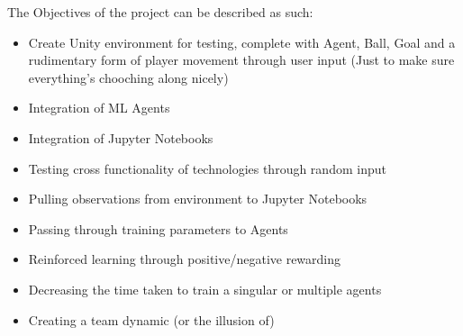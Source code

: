The Objectives of the project can be described as such:

\begin{itemize}
  \item Create Unity environment for testing, complete with Agent, Ball, Goal and a rudimentary form of player movement through user input (Just to make sure 
everything's chooching along nicely)
  \item Integration of ML Agents 
  \item Integration of Jupyter Notebooks
  \item Testing cross functionality of technologies through random input
  \item Pulling observations from environment to Jupyter Notebooks
  \item Passing through training parameters to Agents
  \item Reinforced learning through positive/negative rewarding
  \item Decreasing the time taken to train a singular or multiple agents
  \item Creating a team dynamic (or the illusion of)
\end{itemize}